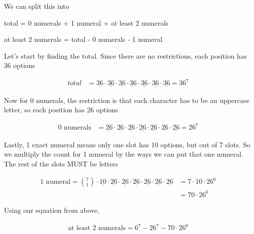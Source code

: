 \documentclass[../Main.tex]{subfiles}
\begin{document}
\begin{alphabet}
    \item 
    {
        We can split this into 

        \begin{center}
            total = 0 numerals + 1 numeral + at least 2 numerals
        \end{center}

        \begin{center}
            at least 2 numerals = total - 0 numerals - 1 numeral
        \end{center}

        Let's start by finding the total. Since there are no restrictions, each position has 36 options

        \begin{align*}
            total &= \underline{36} \cdot \underline{36} \cdot \underline{36} \cdot \underline{36} \cdot \underline{36} \cdot \underline{36} \cdot \underline{36} = 36^7 
        \end{align*}

        Now for 0 numerals, the restriction is that each character has to be an uppercase letter, so each position has 26 options

        \begin{align*}
            0 \text{ numerals} &= \underline{26} \cdot \underline{26} \cdot \underline{26} \cdot \underline{26} \cdot \underline{26} \cdot \underline{26} \cdot \underline{26} = 26^7
        \end{align*}

        Lastly, 1 exact numeral means only one slot has 10 options, but out of 7 slots. So we multiply the count for 1 numeral by the ways we can put that one numeral. The rest of the slots MUST be letters

        \begin{align*}
            1 \text{ numeral} = {7 \choose 1} \cdot \underline{10} \cdot \underline{26} \cdot \underline{26} \cdot \underline{26} \cdot \underline{26} \cdot \underline{26} \cdot \underline{26} &= 7 \cdot 10 \cdot 26^6 \\
            &= 70 \cdot 26^6
        \end{align*}

        Using our equation from above,

        \begin{align*}
            \text{at least 2 numerals} = \boxed{6^7 - 26^7 - 70 \cdot 26^6}
        \end{align*}
    }
    

\end{alphabet}
\end{document}
